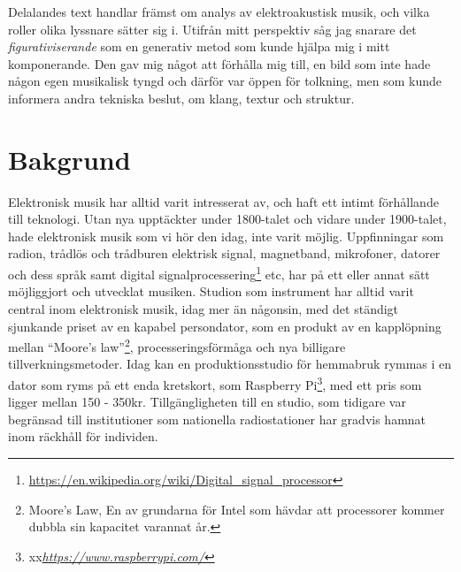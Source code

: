 \documentclass{article}
\begin{document}
Delalandes text handlar främst om analys av elektroakustisk musik, och vilka roller olika lyssnare sätter sig
i. Utifrån mitt perspektiv såg jag snarare det \emph{figurativiserande} som en generativ metod som kunde
hjälpa mig i mitt komponerande. Den gav mig något att förhålla mig till, en bild som inte hade någon egen
musikalisk tyngd och därför var öppen för tolkning, men som kunde informera andra tekniska beslut, om klang,
textur och struktur.




\section{Bakgrund}
Elektronisk musik har alltid varit intresserat av, och haft ett intimt förhållande till teknologi. Utan nya
upptäckter under 1800-talet och vidare under 1900-talet, hade elektronisk musik som vi hör den idag, inte
varit möjlig. Uppfinningar som radion, trådlös och trådburen elektrisk signal, magnetband, mikrofoner, datorer
och dess språk samt digital
signalprocessering\footnote{\url{https://en.wikipedia.org/wiki/Digital\_signal\_processor}} etc, har på
ett eller annat sätt möjliggjort och utvecklat musiken. Studion som instrument %
har alltid varit central inom elektronisk musik, idag mer än någonsin, med det ständigt sjunkande
priset av en kapabel persondator, som en produkt av en kapplöpning mellan ``Moore's law''\footnote{Moore's
Law, En av grundarna för Intel som hävdar att processorer kommer dubbla sin kapacitet varannat år.},
processeringsförmåga och nya billigare tillverkningsmetoder. Idag kan en produktionsstudio för hemmabruk
rymmas i en dator som ryms på ett enda kretskort, som Raspberry Pi\footnote{
xx\emph{\url{https://www.raspberrypi.com/}}}, med ett pris som ligger mellan 150 - 350kr. Tillgängligheten till en
studio, som tidigare var begränsad till institutioner som nationella radiostationer har gradvis hamnat inom
räckhåll för individen.
\end{document}
